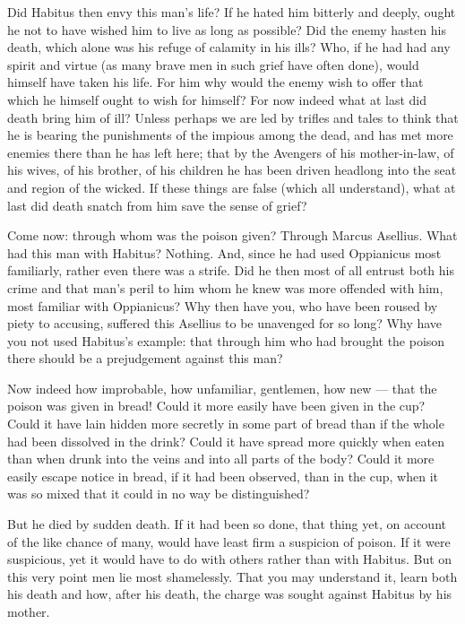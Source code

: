  Did Habitus then envy this man's life? If he hated him bitterly and deeply, ought he not to have wished him to live as long as possible? Did the enemy hasten his death, which alone was his refuge of calamity in his ills? Who, if he had had any spirit and virtue (as many brave men in such grief have often done), would himself have taken his life. For him why would the enemy wish to offer that which he himself ought to wish for himself? For now indeed what at last did death bring him of ill? Unless perhaps we are led by trifles and tales to think that he is bearing the punishments of the impious among the dead, and has met more enemies there than he has left here; that by the Avengers of his mother-in-law, of his wives, of his brother, of his children he has been driven headlong into the seat and region of the wicked. If these things are false (which all understand), what at last did death snatch from him save the sense of grief?

 Come now: through whom was the poison given? Through Marcus Asellius. What had this man with Habitus? Nothing. And, since he had used Oppianicus most familiarly, rather even there was a strife. Did he then most of all entrust both his crime and that man's peril to him whom he knew was more offended with him, most familiar with Oppianicus? Why then have you, who have been roused by piety to accusing, suffered this Asellius to be unavenged for so long? Why have you not used Habitus's example: that through him who had brought the poison there should be a prejudgement against this man?

 Now indeed how improbable, how unfamiliar, gentlemen, how new --- that the poison was given in bread! Could it more easily have been given in the cup? Could it have lain hidden more secretly in some part of bread than if the whole had been dissolved in the drink? Could it have spread more quickly when eaten than when drunk into the veins and into all parts of the body? Could it more easily escape notice in bread, if it had been observed, than in the cup, when it was so mixed that it could in no way be distinguished?

 But he died by sudden death. If it had been so done, that thing yet, on account of the like chance of many, would have least firm a suspicion of poison. If it were suspicious, yet it would have to do with others rather than with Habitus. But on this very point men lie most shamelessly. That you may understand it, learn both his death and how, after his death, the charge was sought against Habitus by his mother.

